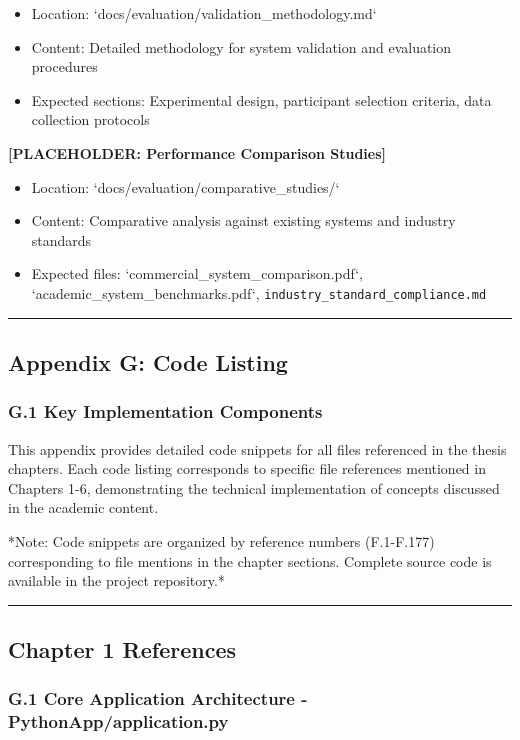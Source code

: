 \documentclass[12pt,a4paper]{article}
\begin{document}
\begin{itemize}
\item Location: `docs/evaluation/validation_methodology.md`
\item Content: Detailed methodology for system validation and evaluation procedures
\item Expected sections: Experimental design, participant selection criteria, data collection protocols

\end{itemize}
\textbf{[PLACEHOLDER: Performance Comparison Studies]}

\begin{itemize}
\item Location: `docs/evaluation/comparative_studies/`
\item Content: Comparative analysis against existing systems and industry standards
\item Expected files: `commercial_system_comparison.pdf`, `academic_system_benchmarks.pdf`,
  \texttt{industry\_standard\_compliance.md}

\end{itemize}
\hrule

\subsection{Appendix G: Code Listing}

\subsubsection{G.1 Key Implementation Components}

This appendix provides detailed code snippets for all files referenced in the thesis chapters. Each code listing
corresponds to specific file references mentioned in Chapters 1-6, demonstrating the technical implementation of
concepts discussed in the academic content.

*Note: Code snippets are organized by reference numbers (F.1-F.177) corresponding to file mentions in the chapter
sections. Complete source code is available in the project repository.*

\hrule

\subsection{Chapter 1 References}

\subsubsection{G.1 Core Application Architecture - PythonApp/application.py}
\end{document}
